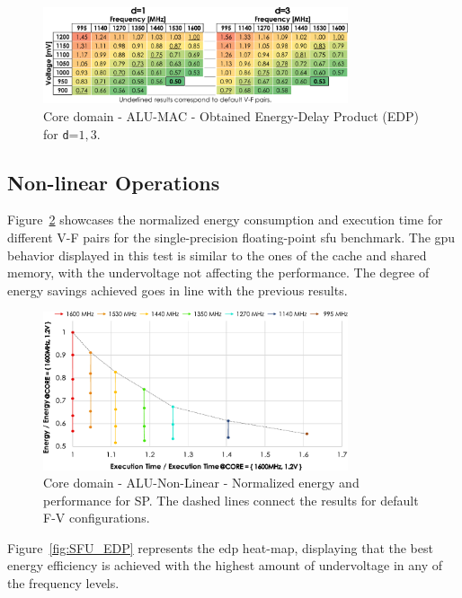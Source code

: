 \begin{figure}[htb]
    \centering
        \includegraphics[width=0.8\textwidth]{Figures/GPU_characterization/MAC_EDP.pdf}
        \caption{Core domain - ALU-MAC - Obtained Energy-Delay Product (EDP) for \texttt{d}=${1,3}$.}
    \label{fig:MAC_EDP}
\end{figure}

\subsection{Non-linear Operations}

Figure~\ref{fig:SFU_behaviour} showcases the normalized energy consumption and execution time for different V-F pairs for the single-precision floating-point \acrshort{sfu} benchmark. The \acrshort{gpu} behavior displayed in this test is similar to the ones of the cache and shared memory, with the undervoltage not affecting the performance. The degree of energy savings achieved goes in line with the previous results.



\begin{figure}[htb]
  \centering
  \includegraphics[width=0.8\textwidth]{Figures/GPU_characterization/SFU_behaviour.pdf}
  \caption{Core domain - ALU-Non-Linear - Normalized energy and performance for SP. The dashed lines connect the results for default F-V configurations.}
  \label{fig:SFU_behaviour}
\end{figure}

Figure~\ref{fig:SFU_EDP} represents the \acrshort{edp} heat-map, displaying that the best energy efficiency is achieved with the highest amount of undervoltage in any of the frequency levels.

